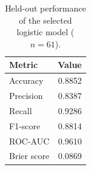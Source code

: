 \begin{table}[t]
\centering
\caption{Held-out performance of the selected logistic model ($n=61$).}
\label{tab:holdout}
\small
\begin{tabular}{lr}
\toprule
Metric & Value \\
\midrule
Accuracy & 0.8852 \\
Precision & 0.8387 \\
Recall & 0.9286 \\
F1-score & 0.8814 \\
ROC-AUC & 0.9610 \\
Brier score & 0.0869 \\
\bottomrule
\end{tabular}
\end{table}

